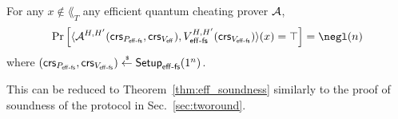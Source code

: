 \begin{theorem}[Soundness]\label{thm:efffs_soundness}
For any $x\notin \lang_T$ any efficient quantum cheating prover $\mathcal{A}$, 
\begin{align*}
\Pr\left[\langle\A^{H,H'}(\crs_{\proefffs},\crs_{\vereff}),\verefffs^{H,H'}(\crs_{\verefffs})\rangle(x)=\top\right]=\negl(\secpar)    
\end{align*}
where $(\mathsf{crs}_{P_{\mathsf{eff}\text{-}\mathsf{fs}}},\mathsf{crs}_{V_{\mathsf{eff}\text{-}\mathsf{fs}}})\overset{\hspace{0.1em}\mathsf{\scriptscriptstyle\$}}{\leftarrow} \mathsf{Setup}_{\mathsf{eff}\text{-}\mathsf{fs}}(1^n)$.
\end{theorem}
This can be reduced to Theorem~\ref{thm:eff_soundness} similarly to the proof of soundness of the protocol in Sec.~\ref{sec:tworound}.









